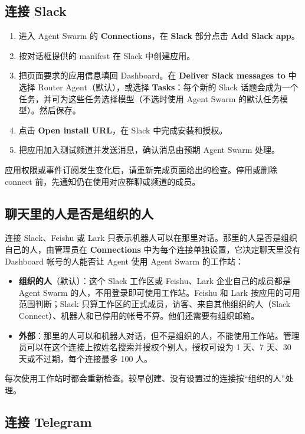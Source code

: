 \documentclass[UTF8,a4paper,11pt]{ctexart}
\begin{document}
\subsection{连接 Slack}

\begin{enumerate}
  \item 进入 Agent Swarm 的 \textbf{Connections}，在 \textbf{Slack} 部分点击 \textbf{Add Slack app}。
  \item 按对话框提供的 manifest 在 Slack 中创建应用。
  \item 把页面要求的应用信息填回 Dashboard。在 \textbf{Deliver Slack messages to} 中选择 Router Agent（默认），或选择 \textbf{Tasks}：每个新的 Slack 话题会成为一个任务，并可为这些任务选择模型（不选时使用 Agent Swarm 的默认任务模型）。然后保存。
  \item 点击 \textbf{Open install URL}，在 Slack 中完成安装和授权。
  \item 把应用加入测试频道并发送消息，确认消息由预期 Agent Swarm 处理。
\end{enumerate}

应用权限或事件订阅发生变化后，请重新完成页面给出的检查。停用或删除 connect 前，先通知仍在使用对应群聊或频道的成员。

\subsection{聊天里的人是否是组织的人}

连接 Slack、Feishu 或 Lark 只表示机器人可以在那里对话。那里的人是否是组织自己的人，由管理员在 \textbf{Connections} 中为每个连接单独设置，它决定聊天里没有 Dashboard 帐号的人能否让 Agent 使用 Agent Swarm 的工作站：

\begin{itemize}
  \item \textbf{组织的人}（默认）：这个 Slack 工作区或 Feishu、Lark 企业自己的成员都是 Agent Swarm 的人，不用登录即可使用工作站。Feishu 和 Lark 按应用的可用范围判断；Slack 只算工作区的正式成员，访客、来自其他组织的人（Slack Connect）、机器人和已停用的帐号不算。他们还需要有组织邮箱。
  \item \textbf{外部}：那里的人可以和机器人对话，但不是组织的人，不能使用工作站。管理员可以在这个连接上按姓名搜索并授权个别人，授权可设为 1 天、7 天、30 天或不过期，每个连接最多 100 人。
\end{itemize}

每次使用工作站时都会重新检查。较早创建、没有设置过的连接按“组织的人”处理。

\subsection{连接 Telegram}
\end{document}
